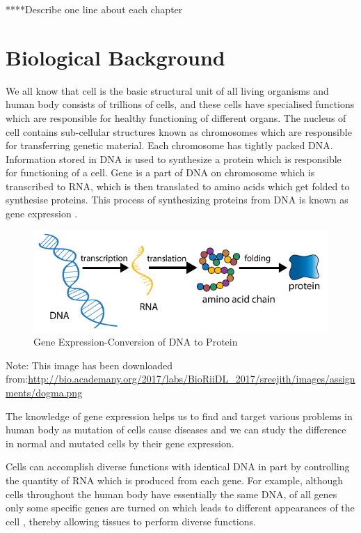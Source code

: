\documentclass{sydneythesis}
\begin{document}
****Describe one line about each chapter

\section{Biological Background}\label{biological-background}

We all know that cell is the basic structural unit of all living
organisms and human body consists of trillions of cells, and these cells
have specialised functions which are responsible for healthy functioning
of different organs. The nucleus of cell contains sub-cellular
structures known as chromosomes which are responsible for transferring
genetic material. Each chromosome has tightly packed DNA. Information
stored in DNA is used to synthesize a protein which is responsible for
functioning of a cell. Gene is a part of DNA on chromosome which is
transcribed to RNA, which is then translated to amino acids which get
folded to synthesise proteins. This process of synthesizing proteins
from DNA is known as gene expression \autocite{crick1970central} .

\begin{figure}

{\centering \includegraphics[width=8.35in]{Figure-1} 

}

\caption{Gene Expression-Conversion of DNA to Protein}\label{fig:unnamed-chunk-2}
\end{figure}

Note: This image has been downloaded
from:\url{http://bio.academany.org/2017/labs/BioRiiDL_2017/sreejith/images/assignments/dogma.png}

The knowledge of gene expression helps us to find and target various
problems in human body as mutation of cells cause diseases and we can
study the difference in normal and mutated cells by their gene
expression.

Cells can accomplish diverse functions with identical DNA in part by
controlling the quantity of RNA which is produced from each gene. For
example, although cells throughout the human body have essentially the
same DNA, of all genes only some specific genes are turned on which
leads to different appearances of the cell \autocite{schug2005promoter},
thereby allowing tissues to perform diverse functions.
\end{document}
